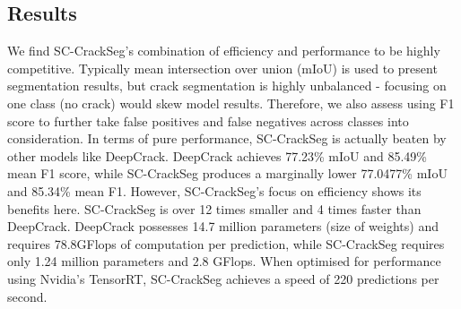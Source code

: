 \documentclass[a4paper,12pt]{report}
\begin{document}
    \subsection{Results}
    We find SC-CrackSeg's combination of efficiency and performance to be highly competitive. Typically mean intersection over union (mIoU) is used to present segmentation results, but crack segmentation is highly unbalanced - focusing on one class (no crack) would skew model results. Therefore, we also assess using F1 score to further take false positives and false negatives across classes into consideration. In terms of pure performance, SC-CrackSeg is actually beaten by other models like DeepCrack. DeepCrack achieves 77.23\% mIoU and 85.49\% mean F1 score, while SC-CrackSeg produces a marginally lower 77.0477\% mIoU and 85.34\% mean F1. However, SC-CrackSeg's focus on efficiency shows its benefits here. SC-CrackSeg is over 12 times smaller and 4 times faster than DeepCrack. DeepCrack possesses 14.7 million parameters (size of weights) and requires 78.8GFlops of computation per prediction, while SC-CrackSeg requires only 1.24 million parameters and 2.8 GFlops. When optimised for performance using Nvidia's TensorRT, SC-CrackSeg achieves a speed of 220 predictions per second.
\end{document}
